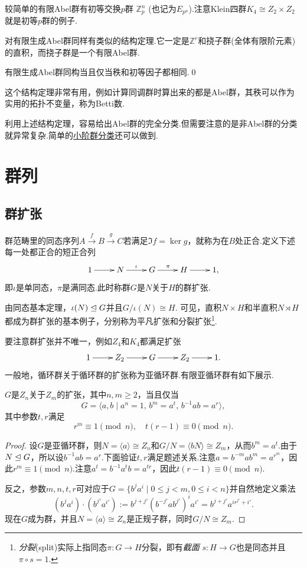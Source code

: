 较简单的有限Abel群有{\heiti 初等交换$p$群} $\mathbb{Z}_p^n$ (也记为$E_{p^n}$).注意Klein四群$K_4\cong Z_2\times Z_2$就是初等$p$群的例子.

对有限生成Abel群同样有类似的结构定理.它一定是$\mathbb{Z}^r$和{\heiti 挠子群}(全体有限阶元素)的直积，而挠子群是一个有限Abel群.

\begin{thm}[(有限生成Abel群结构)]
	有限生成Abel群同构当且仅当秩和初等因子都相同.\qed
\end{thm}
\begin{remark}
	这个结构定理非常有用，例如计算同调群时算出来的都是Abel群，其秩可以作为实用的拓扑不变量，称为Betti数.
\end{remark}

利用上述结构定理，容易给出Abel群的完全分类.但需要注意的是非Abel群的分类就异常复杂.简单的\hyperref[subsec:ClassificationSmallOrder]{小阶群分类}还可以做到.

\section{群列}
\subsection{群扩张}\label{subsec:GroupExtension}
群范畴里的同态序列$A\overset{f}{\to} B\overset{g}{\to} C$若满足$\Im f=\ker g$，就称为在$B$处{\heiti 正合}.定义下述每一处都正合的{\heiti 短正合列}
\[
	\xymatrix{
		1\ar[r]&N\ar[r]^\iota&G\ar[r]^\pi&H\ar[r]&1,
	}
\]
即$\iota$是单同态，$\pi$是满同态.此时称群$G$是$N$关于$H$的{\heiti 群扩张}.

由同态基本定理，$\iota(N)\trianglelefteq G$并且$G/\iota(N)\cong H$.
可见，直积$N\times H$和半直积$N\rtimes H$都成为群扩张的基本例子，分别称为{\heiti 平凡扩张}和{\heiti 分裂扩张}\footnote{\emph{分裂}(split)实际上指同态$\pi\colon G\to H$分裂，即有\emph{截面} $s\colon H\to G$也是同态并且$\pi\circ s=1$.}.

要注意群扩张并不唯一，例如$Z_4$和$K_4$都满足扩张
\[
	\xymatrix{
		1\ar[r]&Z_2\ar[r]&G\ar[r]&Z_2\ar[r]&1.
	}
\]
一般地，循环群关于循环群的扩张称为{\heiti 亚循环群}.有限亚循环群有如下展示.
\begin{thm}[(H\"older)]
	$G$是$Z_n$关于$Z_m$的扩张，其中$n,m\ge 2$，当且仅当
	\[
		G=\langle a,b\mid a^n=1,\,b^m=a^t,\,b^{-1}ab=a^r\rangle ,
	\]
	其中参数$t,r$满足\hypertarget{thm:Metacyclic}{}
	\[
		r^m\equiv 1\pmod{n},\quad t(r-1)\equiv 0\pmod{n}.
	\]
\end{thm}
\begin{proof}
	设$G$是亚循环群，则$N=\langle a\rangle\cong Z_n$和$G/N=\langle bN\rangle \cong Z_m$，从而$b^m=a^t$.由于$N\trianglelefteq G$，所以设$b^{-1}ab=a^r$.下面验证$t,r$满足题述关系.注意$a=b^{-m}ab^m=a^{r^m}$，因此$r^m\equiv 1\pmod n$.注意$a^t=b^{-1}a^tb=a^{tr}$，因此$t(r-1)\equiv 0\pmod n$.

	反之，参数$m,n,t,r$可对应于$G=\{b^ja^i\mid 0\le j<m,0\le i<n\}$并自然地定义乘法
	\[
		(b^ja^i)\cdot (b^{j'}a^{i'}):=b^{j+j'}(b^{-j'}ab^{j'})^ia^{i'}=b^{j+j'}a^{ir^{j'}+i'}.
	\]
	现在$G$成为群，并且$N=\langle a\rangle\cong Z_n$是正规子群，同时$G/N\cong Z_m$.
\end{proof}

